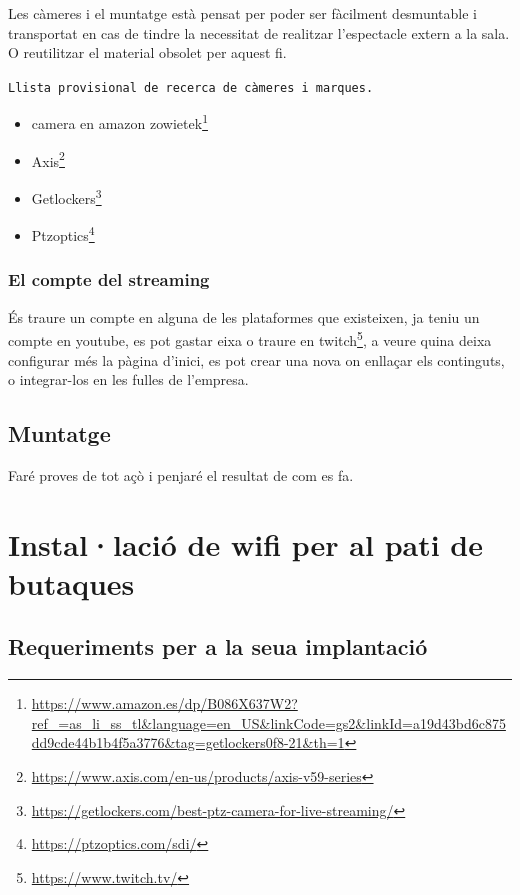 \documentclass[
  10pt,
]{krantz}
\DeclareRobustCommand{\href}[2]{#2\footnote{\url{#1}}}
\begin{document}
Les càmeres i el muntatge està pensat per poder ser fàcilment desmuntable i transportat en cas de tindre la necessitat de realitzar l'espectacle extern a la sala. O reutilitzar el material obsolet per aquest fi.

\texttt{Llista\ provisional\ de\ recerca\ de\ càmeres\ i\ marques.}

\begin{itemize}
\item
  \href{https://www.amazon.es/dp/B086X637W2?ref_=as_li_ss_tl\&language=en_US\&linkCode=gs2\&linkId=a19d43bd6c875dd9cde44b1b4f5a3776\&tag=getlockers0f8-21\&th=1}{camera en amazon zowietek}
\item
  \href{https://www.axis.com/en-us/products/axis-v59-series}{Axis}
\item
  \href{https://getlockers.com/best-ptz-camera-for-live-streaming/}{Getlockers}
\item
  \href{https://ptzoptics.com/sdi/}{Ptzoptics}
\end{itemize}

\hypertarget{el-compte-del-streaming}{%
\subsection{El compte del streaming}\label{el-compte-del-streaming}}

És traure un compte en alguna de les plataformes que existeixen, ja teniu un compte en youtube, es pot gastar eixa o traure en \href{https://www.twitch.tv/}{twitch}, a veure quina deixa configurar més la pàgina d'inici, es pot crear una nova on enllaçar els continguts, o integrar-los en les fulles de l'empresa.

\hypertarget{muntatge}{%
\section{Muntatge}\label{muntatge}}

Faré proves de tot açò i penjaré el resultat de com es fa.

\hypertarget{installaciuxf3-de-wifi-per-al-pati-de-butaques}{%
\chapter{Instal·lació de wifi per al pati de butaques}\label{installaciuxf3-de-wifi-per-al-pati-de-butaques}}

\hypertarget{requeriments-per-a-la-seua-implantaciuxf3}{%
\section{Requeriments per a la seua implantació}\label{requeriments-per-a-la-seua-implantaciuxf3}}
\end{document}
